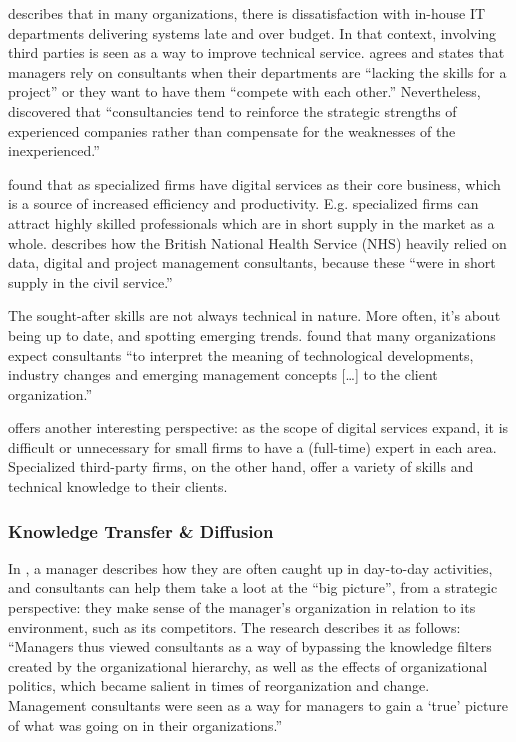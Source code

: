 \documentclass[12pt]{article}
\begin{document}
\citet[12]{lacity1994} describes that in many organizations, there is
dissatisfaction with in-house IT departments delivering systems late and
over budget. In that context, involving third parties is seen as a way
to improve technical service. \citet[233]{sturdy1998} agrees and states
that managers rely on consultants when their departments are ``lacking
the skills for a project'' or they want to have them ``compete with each
other.'' Nevertheless, \citet[656]{wood1996} discovered that
``consultancies tend to reinforce the strategic strengths of experienced
companies rather than compensate for the weaknesses of the
inexperienced.''

\citet[52]{aubert1996} found that as specialized firms have digital
services as their core business, which is a source of increased
efficiency and productivity. E.g. specialized firms can attract highly
skilled professionals which are in short supply in the market as a
whole. \citet[28]{mazzucato2023} describes how the British National
Health Service (NHS) heavily relied on data, digital and project
management consultants, because these ``were in short supply in the
civil service.''

The sought-after skills are not always technical in nature. More often,
it's about being up to date, and spotting emerging trends.
\citet[53]{werr2002} found that many organizations expect consultants
``to interpret the meaning of technological developments, industry
changes and emerging management concepts {[}\ldots{]} to the client
organization.''

\citet[452]{ketler1993} offers another interesting perspective: as the
scope of digital services expand, it is difficult or unnecessary for
small firms to have a (full-time) expert in each area. Specialized
third-party firms, on the other hand, offer a variety of skills and
technical knowledge to their clients.

\subsubsection{Knowledge Transfer \&
Diffusion}\label{knowledge-transfer-diffusion}

In \citet[53-54]{werr2002}, a manager describes how they are often
caught up in day-to-day activities, and consultants can help them take a
loot at the ``big picture'', from a strategic perspective: they make
sense of the manager's organization in relation to its environment, such
as its competitors. The research describes it as follows: ``Managers
thus viewed consultants as a way of bypassing the knowledge filters
created by the organizational hierarchy, as well as the effects of
organizational politics, which became salient in times of reorganization
and change. Management consultants were seen as a way for managers to
gain a `true' picture of what was going on in their organizations.''
\end{document}
